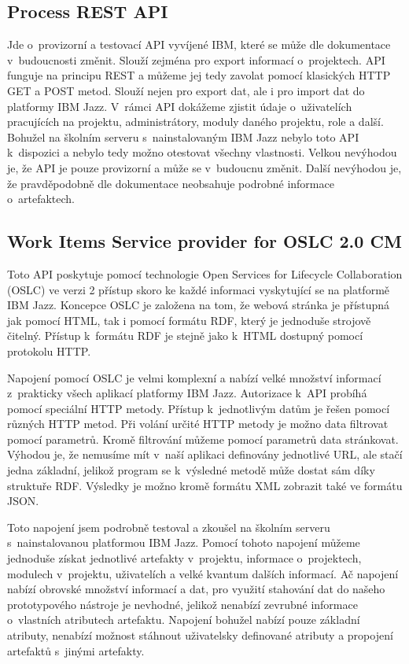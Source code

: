 \documentclass[czech,master]{diploma}
\begin{document}
\subsection{Process REST API}
Jde o~provizorní a testovací API vyvíjené IBM, které se může dle dokumentace v~budoucnosti změnit. Slouží zejména pro export informací o~projektech. API funguje na principu REST a můžeme jej tedy  zavolat pomocí klasických HTTP GET a POST metod. Slouží nejen pro export dat, ale i pro import dat do platformy IBM Jazz. V~rámci API dokážeme zjistit údaje o~uživatelích pracujících na projektu, administrátory, moduly daného projektu, role a další. Bohužel na školním serveru s~nainstalovaným IBM Jazz nebylo toto API k~dispozici a nebylo tedy možno otestovat všechny vlastnosti. Velkou nevýhodou je, že API je pouze provizorní a může se v~budoucnu změnit. Další nevýhodou je, že pravděpodobně dle dokumentace neobsahuje podrobné informace o~artefaktech.

\subsection{Work Items Service provider for OSLC 2.0 CM}
Toto API poskytuje pomocí technologie Open Services for Lifecycle Collaboration (OSLC) ve verzi 2 přístup skoro ke každé informaci vyskytující se na platformě IBM Jazz. Koncepce OSLC je založena na tom, že webová stránka je přístupná jak pomocí HTML, tak i pomocí formátu RDF, který je jednoduše strojově čitelný. Přístup k~formátu RDF je stejně jako k~HTML dostupný pomocí protokolu HTTP.

Napojení pomocí OSLC je velmi komplexní a nabízí velké množství informací z~prakticky všech aplikací platformy IBM Jazz. Autorizace k~API probíhá pomocí speciální HTTP metody. Přístup k~jednotlivým datům je řešen pomocí různých HTTP metod. Při volání určité HTTP metody je možno data filtrovat pomocí parametrů. Kromě filtrování můžeme pomocí parametrů data stránkovat. Výhodou je, že nemusíme mít v~naší aplikaci definovány jednotlivé URL, ale stačí jedna základní, jelikož program se k~výsledné metodě může dostat sám díky struktuře RDF. Výsledky je možno kromě formátu XML zobrazit také ve formátu JSON.

Toto napojení jsem podrobně testoval a zkoušel na školním serveru s~nainstalovanou platformou IBM Jazz. Pomocí tohoto napojení můžeme jednoduše získat jednotlivé artefakty v~projektu, informace o~projektech, modulech v~projektu, uživatelích a velké kvantum dalších informací. Ač napojení nabízí obrovské množství informací a dat, pro využití stahování dat do našeho prototypového nástroje je nevhodné, jelikož nenabízí zevrubné informace o~vlastních atributech artefaktu. Napojení bohužel nabízí pouze základní atributy, nenabízí možnost stáhnout uživatelsky definované atributy a propojení artefaktů s~jinými artefakty.
\end{document}

